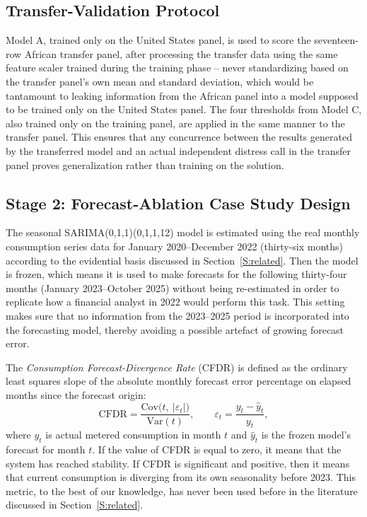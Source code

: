 \documentclass[final,1p,times]{elsarticle}
\begin{document}
\subsection{Transfer-Validation Protocol}
\label{S:transfer-design}

Model A, trained only on the United States panel, is used to score the seventeen-row African transfer panel, after processing the transfer data using the same feature scaler trained during the training phase -- never standardizing based on the transfer panel’s own mean and standard deviation, which would be tantamount to leaking information from the African panel into a model supposed to be trained only on the United States panel. The four thresholds from Model C, also trained only on the training panel, are applied in the same manner to the transfer panel. This ensures that any concurrence between the results generated by the transferred model and an actual independent distress call in the transfer panel proves generalization rather than training on the solution.

\subsection{Stage 2: Forecast-Ablation Case Study Design}
\label{S:forecast-design}

The seasonal SARIMA(0,1,1)(0,1,1,12) model is estimated using the real monthly consumption series data for January 2020--December 2022 (thirty-six months) according to the evidential basis discussed in Section~\ref{S:related}. Then the model is frozen, which means it is used to make forecasts for the following thirty-four months (January 2023--October 2025) without being re-estimated in order to replicate how a financial analyst in 2022 would perform this task. This setting makes sure that no information from the 2023--2025 period is incorporated into the forecasting model, thereby avoiding a possible artefact of growing forecast error.

The \emph{Consumption Forecast-Divergence Rate} (CFDR) is defined as the ordinary least squares slope of the absolute monthly forecast error percentage on elapsed months since the forecast origin:
\[
\text{CFDR} = \frac{\mathrm{Cov}\big(t,\ |\varepsilon_t|\big)}{\mathrm{Var}(t)}, \qquad \varepsilon_t = \frac{y_t - \hat{y}_t}{y_t},
\]
where $y_t$ is actual metered consumption in month $t$ and $\hat{y}_t$ is the frozen model's forecast for month $t$. If the value of CFDR is equal to zero, it means that the system has reached stability. If CFDR is significant and positive, then it means that current consumption is diverging from its own seasonality before 2023. This metric, to the best of our knowledge, has never been used before in the literature discussed in Section~\ref{S:related}.
\end{document}
